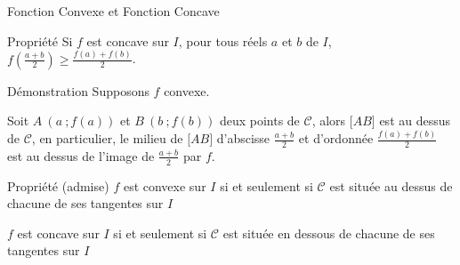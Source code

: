 \documentclass{coursbook}
\begin{document}
\begin{Gpartie}{Fonction Convexe et Fonction Concave}
\begin{Spartie}{Propriété}
            Si $f$ est concave sur $I$, pour tous réels $a$ et $b$ de $I$, $f\left(\frac{a+b}{2}\right)\geq\frac{f(a)+f(b)}{2}$.
            \begin{SSpartie}{Démonstration} 
                Supposons $f$ convexe.

                Soit $A~\left(a~;f(a)\right)$ et $B~\left(b~;f(b)\right)$ deux points de $\mathcal{C}$, alors $\big[AB\big]$ est au dessus de $\mathcal{C}$, en particulier, le milieu de $\big[AB\big]$ d'abscisse $\frac{a+b}{2}$ et d'ordonnée $\frac{f(a)+f(b)}{2}$ est au dessus de l'image de $\frac{a+b}{2}$ par $f$.
            \end{SSpartie}
        \end{Spartie}
        \begin{Spartie}{Propriété (admise)} 
            $f$ est convexe sur $I$ si et seulement si $\mathcal{C}$ est située au dessus de chacune de ses tangentes sur $I$

            $f$ est concave sur $I$ si et seulement si $\mathcal{C}$ est située en dessous de chacune de ses tangentes sur $I$

            \begin{center}
\end{center}
\end{Spartie}
\end{Gpartie}
\end{document}
